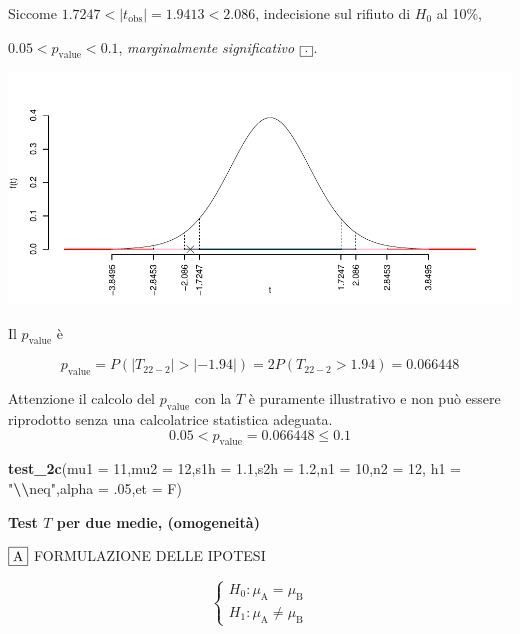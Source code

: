 \documentclass[
  11pt,
]{book}
\newenvironment{Shaded}{\begin{snugshade}}{\end{snugshade}}
\newcommand{\AttributeTok}[1]{\textcolor[rgb]{0.13,0.29,0.53}{#1}}
\newcommand{\DecValTok}[1]{\textcolor[rgb]{0.00,0.00,0.81}{#1}}
\newcommand{\FloatTok}[1]{\textcolor[rgb]{0.00,0.00,0.81}{#1}}
\newcommand{\FunctionTok}[1]{\textcolor[rgb]{0.13,0.29,0.53}{\textbf{#1}}}
\newcommand{\NormalTok}[1]{#1}
\newcommand{\SpecialCharTok}[1]{\textcolor[rgb]{0.81,0.36,0.00}{\textbf{#1}}}
\newcommand{\StringTok}[1]{\textcolor[rgb]{0.31,0.60,0.02}{#1}}
\theoremstyle{mytheoremstyle}
\theoremstyle{mydefstyle}
\begin{document}
Siccome \(1.7247<|t_\text{obs}|=1.9413<2.086\), indecisione sul rifiuto di \(H_0\) al 10\%,

\(0.05<p_\text{value}<0.1\), \emph{marginalmente significativo} \(\fbox{.}\).

\begin{center}\includegraphics{Appunti_di_Statistica_2025_files/figure-latex/25-test-functions-10-8} \end{center}

Il \(p_{\text{value}}\) è

\[ p_{\text{value}} = P(|T_{22-2}|>|-1.94|)=2P(T_{22-2}>1.94)=0.066448 \]

Attenzione il calcolo del \(p_\text{value}\) con la \(T\) è puramente illustrativo e non può essere riprodotto senza una calcolatrice statistica adeguata.\[
 0.05 < p_\text{value}= 0.066448 \leq 0.1 
\]

\begin{Shaded}
\begin{Highlighting}[]
\FunctionTok{test\_2c}\NormalTok{(}\AttributeTok{mu1 =} \DecValTok{11}\NormalTok{,}\AttributeTok{mu2 =} \DecValTok{12}\NormalTok{,}\AttributeTok{s1h =} \FloatTok{1.1}\NormalTok{,}\AttributeTok{s2h =} \FloatTok{1.2}\NormalTok{,}\AttributeTok{n1 =} \DecValTok{10}\NormalTok{,}\AttributeTok{n2 =} \DecValTok{12}\NormalTok{,}
            \AttributeTok{h1 =} \StringTok{"}\SpecialCharTok{\textbackslash{}\textbackslash{}}\StringTok{neq"}\NormalTok{,}\AttributeTok{alpha =}\NormalTok{ .}\DecValTok{05}\NormalTok{,}\AttributeTok{et =}\NormalTok{ F)}
\end{Highlighting}
\end{Shaded}

\textbf{Test \(T\) per due medie, (omogeneità)}

\(\fbox{A}\) FORMULAZIONE DELLE IPOTESI

\[\begin{cases}
   H_0: \mu_\text{A} = \mu_\text{B} \\
   H_1: \mu_\text{A} \neq \mu_\text{B} 
   \end{cases}\]
\end{document}
